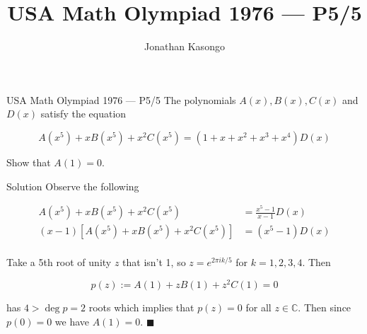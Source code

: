 \documentclass{article}
\author{Jonathan Kasongo}
\title{USA Math Olympiad 1976 --- P5/5}
\begin{document}
\maketitle

\begin{problem}{USA Math Olympiad 1976 --- P5/5}
The polynomials $A(x), B(x), C(x)$ and $D(x)$ satisfy the equation

$$
A(x^5) + xB(x^5) + x^2 C(x^5) = (1+x+x^2+x^3+x^4)D(x)
$$

Show that $A(1)=0$.
\end{problem}

\begin{solution}{Solution}
Observe the following

\[
\begin{aligned}
A(x^5) + xB(x^5) + x^2 C(x^5) &= \frac{x^5 - 1}{x-1}D(x) \\
(x-1)[A(x^5) + xB(x^5) + x^2 C(x^5)] &= (x^5 - 1)D(x) \\
\end{aligned}
\]

Take a 5th root of unity $z$ that isn't 1, so $z = e^{2\pi i k/5}$ for
$k=1,2,3,4$. Then

$$
p(z) := A(1) + zB(1) + z^2C(1) = 0
$$

has $4 > \deg p = 2$ roots which implies that $p(z) = 0$ for all
$z\in \mathbb{C}$. Then since $p(0) = 0$ we have $A(1) = 0$. $\blacksquare$
\end{solution}
\end{document}
